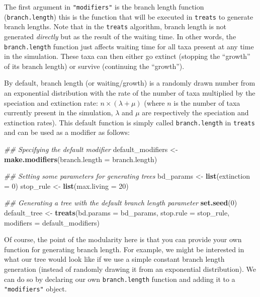 \documentclass[
]{book}
\newenvironment{Shaded}{\begin{snugshade}}{\end{snugshade}}
\newcommand{\CommentTok}[1]{\textcolor[rgb]{0.56,0.35,0.01}{\textit{#1}}}
\newcommand{\DataTypeTok}[1]{\textcolor[rgb]{0.13,0.29,0.53}{#1}}
\newcommand{\DecValTok}[1]{\textcolor[rgb]{0.00,0.00,0.81}{#1}}
\newcommand{\KeywordTok}[1]{\textcolor[rgb]{0.13,0.29,0.53}{\textbf{#1}}}
\newcommand{\NormalTok}[1]{#1}
\newcommand{\StringTok}[1]{\textcolor[rgb]{0.31,0.60,0.02}{#1}}
\begin{document}
The first argument in \texttt{"modifiers"} is the branch length function (\texttt{branch.length}) this is the function that will be executed in \texttt{treats} to generate branch lengths.
Note that in the \texttt{treats} algorithm, branch length is not generated \emph{directly} but as the result of the waiting time.
In other words, the \texttt{branch.length} function just affects waiting time for all taxa present at any time in the simulation.
These taxa can then either go extinct (stopping the ``growth'' of its branch length) or survive (continuing the ``growth'').

By default, branch length (or waiting/growth) is a randomly drawn number from an exponential distribution with the rate of the number of taxa multiplied by the speciation and extinction rate: \(n \times (\lambda + \mu)\) (where \(n\) is the number of taxa currently present in the simulation, \(\lambda\) and \(\mu\) are respectively the speciation and extinction rates).
This default function is simply called \texttt{branch.length} in \texttt{treats} and can be used as a modifier as follows:

\begin{Shaded}
\begin{Highlighting}[]
\CommentTok{\#\# Specifying the default modifier}
\NormalTok{default\_modifiers \textless{}{-}}\StringTok{ }\KeywordTok{make.modifiers}\NormalTok{(}\DataTypeTok{branch.length =}\NormalTok{ branch.length)}

\CommentTok{\#\# Setting some parameters for generating trees}
\NormalTok{bd\_params \textless{}{-}}\StringTok{ }\KeywordTok{list}\NormalTok{(}\DataTypeTok{extinction =} \DecValTok{0}\NormalTok{)}
\NormalTok{stop\_rule \textless{}{-}}\StringTok{ }\KeywordTok{list}\NormalTok{(}\DataTypeTok{max.living =} \DecValTok{20}\NormalTok{)}

\CommentTok{\#\# Generating a tree with the default branch length parameter}
\KeywordTok{set.seed}\NormalTok{(}\DecValTok{0}\NormalTok{)}
\NormalTok{default\_tree \textless{}{-}}\StringTok{ }\KeywordTok{treats}\NormalTok{(}\DataTypeTok{bd.params =}\NormalTok{ bd\_params,}
                       \DataTypeTok{stop.rule =}\NormalTok{ stop\_rule,}
                       \DataTypeTok{modifiers =}\NormalTok{ default\_modifiers)}
\end{Highlighting}
\end{Shaded}

Of course, the point of the modularity here is that you can provide your own function for generating branch length.
For example, we might be interested in what our tree would look like if we use a simple constant branch length generation (instead of randomly drawing it from an exponential distribution).
We can do so by declaring our own \texttt{branch.length} function and adding it to a \texttt{"modifiers"} object.
\end{document}
